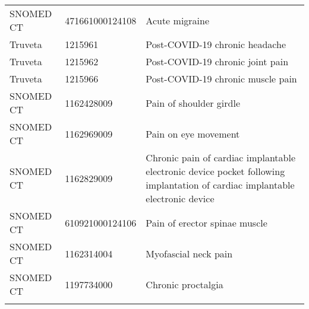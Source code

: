 \begin{longtable}{p{}p{}p{}}
  SNOMED CT & 471661000124108 & Acute migraine \\ 
  Truveta & 1215961 & Post-COVID-19 chronic headache \\ 
  Truveta & 1215962 & Post-COVID-19 chronic joint pain \\ 
  Truveta & 1215966 & Post-COVID-19 chronic muscle pain \\ 
  SNOMED CT & 1162428009 & Pain of shoulder girdle \\ 
  SNOMED CT & 1162969009 & Pain on eye movement \\ 
  SNOMED CT & 1162829009 & Chronic pain of cardiac implantable electronic device pocket following implantation of cardiac implantable electronic device \\ 
  SNOMED CT & 610921000124106 & Pain of erector spinae muscle \\ 
  SNOMED CT & 1162314004 & Myofascial neck pain \\ 
  SNOMED CT & 1197734000 & Chronic proctalgia \\ 
  \hline
\label{tab:codes_pain}
\end{longtable}
